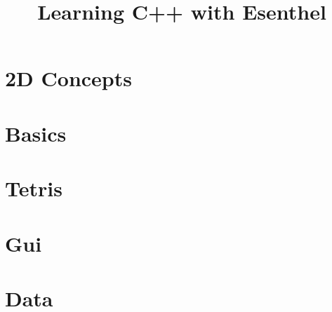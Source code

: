 \documentclass[11pt, oldfontcommands, oneside, a4paper]{memoir}
\title{Learning C++ with Esenthel}
\def \langPath {nl/}
\def \langPath {en/}
\begin{document}
\titleGM
\tableofcontents


\part{2D Concepts}






\part{Basics}











\part{Tetris}






\part{Gui}







\part{Data}







\end{document}
